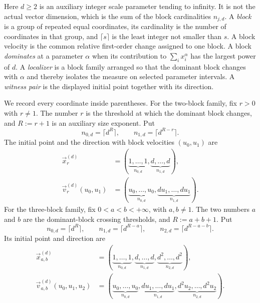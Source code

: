\documentclass[aps,pra,11pt,onecolumn,nofootinbib,tightenlines]{revtex4-2}
\theoremstyle{definition}
\begin{document}
Here $d\geq2$ is an auxiliary integer scale parameter tending to infinity.
It is not the actual vector dimension, which is the sum of the block
cardinalities $n_{j,d}$.  A \emph{block} is a group of repeated equal
coordinates, its cardinality is the number of coordinates in that group, and
$\lceil s\rceil$ is the least integer not smaller than $s$.  A block velocity
is the common relative first-order change assigned to one block.  A block
\emph{dominates} at a parameter $\alpha$ when its contribution to
$\sum_i x_i^\alpha$ has the largest power of $d$.  A \emph{localizer} is a
block family arranged so that the dominant block changes with $\alpha$ and
thereby isolates the measure on selected parameter intervals.  A
\emph{witness pair} is the displayed initial point together with its
direction.

We record every coordinate inside parentheses.  For the two-block family, fix
$r>0$ with $r\neq1$.  The number $r$ is the threshold at which the dominant
block changes, and $R:=r+1$ is an auxiliary size exponent.  Put
\begin{equation}
n_{0,d}=\lceil d^R\rceil,
\qquad
n_{1,d}=\lceil d^{R-r}\rceil.
\end{equation}
The initial point and the direction with block velocities $(u_0,u_1)$ are
\begin{align}
\vec{x}_r^{(d)}
&=\left(
\underbrace{1,\ldots,1}_{n_{0,d}},
\underbrace{d,\ldots,d}_{n_{1,d}}
\right),
\label{eq:concise-two-block-point}\\
\vec{v}_r^{(d)}(u_0,u_1)
&=\left(
\underbrace{u_0,\ldots,u_0}_{n_{0,d}},
\underbrace{d u_1,\ldots,d u_1}_{n_{1,d}}
\right).
\label{eq:concise-two-block-direction}
\end{align}
For the three-block family, fix $0<a<b<+\infty$, with $a,b\neq1$.  The two
numbers $a$ and $b$ are the dominant-block crossing thresholds, and
$R:=a+b+1$.  Put
\begin{equation}
n_{0,d}=\lceil d^R\rceil,
\qquad
n_{1,d}=\lceil d^{R-a}\rceil,
\qquad
n_{2,d}=\lceil d^{R-a-b}\rceil.
\end{equation}
Its initial point and direction are
\begin{align}
\vec{x}_{a,b}^{(d)}
&=\left(
\underbrace{1,\ldots,1}_{n_{0,d}},
\underbrace{d,\ldots,d}_{n_{1,d}},
\underbrace{d^2,\ldots,d^2}_{n_{2,d}}
\right),
\label{eq:concise-three-block-point}\\
\vec{v}_{a,b}^{(d)}(u_0,u_1,u_2)
&=\left(
\underbrace{u_0,\ldots,u_0}_{n_{0,d}},
\underbrace{d u_1,\ldots,d u_1}_{n_{1,d}},
\underbrace{d^2u_2,\ldots,d^2u_2}_{n_{2,d}}
\right).
\label{eq:concise-three-block-direction}
\end{align}
\end{document}
